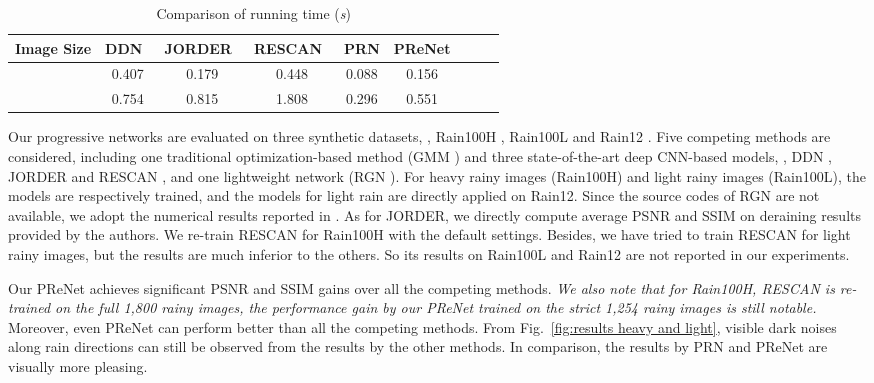 \documentclass[10pt,twocolumn,letterpaper]{article}
\begin{document}
\begin{table*}[!htb]\small
	\setlength{\tabcolsep}{3pt}
	\caption{Comparison of running time (\emph{s})}
	
	\centering
	\begin{tabular}{c|ccc|ccccc}
		\hline
		
		\hline
		Image Size         & DDN~\cite{fu2017removing}  & JORDER~\cite{yang2017deep}   & RESCAN~\cite{li2018recurrent}  & PRN  & PReNet  \\
		\hline
		   & 0.407     &  0.179       & 0.448   & 0.088  & 0.156  \\
		 & 0.754     &  0.815       & 1.808   & 0.296  & 0.551  \\
		\hline
	
		\hline
\end{tabular}
	\label{table:time}
\end{table*}

Our progressive networks are evaluated on three synthetic datasets, \ie, Rain100H \cite{yang2017deep}, Rain100L \cite{yang2017deep} and Rain12 \cite{li2016rain}.
Five competing methods are considered, including one traditional optimization-based method (GMM \cite{li2016rain}) and three state-of-the-art deep CNN-based models, \ie, DDN \cite{fu2017removing}, JORDER \cite{yang2017deep} and RESCAN \cite{li2018recurrent}, and one lightweight network (RGN \cite{fan2018residual}).
For heavy rainy images (Rain100H) and light rainy images (Rain100L), the models are respectively trained, and the models for light rain are directly applied on Rain12.
Since the source codes of RGN are not available, we adopt the numerical results reported in \cite{fan2018residual}.
As for JORDER, we directly compute average PSNR and SSIM on deraining results provided by the authors.
We re-train RESCAN \cite{li2018recurrent} for Rain100H with the default settings.
Besides, we have tried to train RESCAN for light rainy images, but the results are much inferior to the others.
So its results on Rain100L and Rain12 are not reported in our experiments.


Our PReNet achieves significant PSNR and SSIM gains over all the competing methods.
{\emph{We also note that for Rain100H, RESCAN \cite{li2018recurrent} is re-trained on the full 1,800 rainy images, the performance gain by our PReNet trained on the strict 1,254 rainy images is still notable. }}
Moreover, even PReNet can perform better than all the competing methods.
From Fig.~\ref{fig:results heavy and light}, visible dark noises along rain directions can still be observed from the results by the other methods.
In comparison, the results by PRN and PReNet are visually more pleasing.
\end{document}

